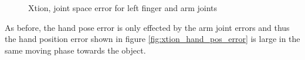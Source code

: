 \begin{figure}
\centering
{}

\caption{Xtion, joint space error for left finger and arm joints}
\label{fig:xtion_joint_error}
\end{figure}

As before, the hand pose error is only effected by the arm joint errors and thus the hand position error shown in figure \ref{fig:xtion_hand_pos_error} is large in the same moving phase towards the object.

